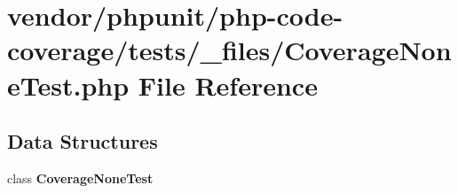 \section{vendor/phpunit/php-\/code-\/coverage/tests/\+\_\+files/\+Coverage\+None\+Test.php File Reference}
\label{php-code-coverage_2tests_2__files_2_coverage_none_test_8php}
\subsection*{Data Structures}
\begin{DoxyCompactItemize}
\item 
class {\bf Coverage\+None\+Test}
\end{DoxyCompactItemize}
